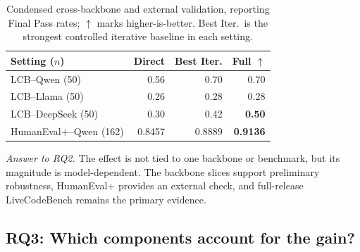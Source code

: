 \documentclass{article}
\newcommand{\up}{\ensuremath{\uparrow}}
\begin{document}
\begin{table}[t]
\centering
\small
\begin{tabular}{@{}lrrr@{}}
\toprule
Setting ($n$) & Direct & Best Iter. & Full \up \\
\midrule
LCB--Qwen (50) & 0.56 & 0.70 & 0.70 \\
LCB--Llama (50) & 0.26 & 0.28 & 0.28 \\
LCB--DeepSeek (50) & 0.30 & 0.42 & \textbf{0.50} \\
HumanEval+--Qwen (162) & 0.8457 & 0.8889 & \textbf{0.9136} \\
\bottomrule
\end{tabular}
\caption{Condensed cross-backbone and external validation, reporting Final Pass rates; \up{} marks higher-is-better. Best Iter.\ is the strongest controlled iterative baseline in each setting.}
\label{tab:robustness}
\end{table}

\noindent\textit{Answer to RQ2.}
The effect is not tied to one backbone or benchmark, but its magnitude is model-dependent. The backbone slices support preliminary robustness, HumanEval+ provides an external check, and full-release LiveCodeBench remains the primary evidence.

\subsection{RQ3: Which components account for the gain?}
\end{document}
